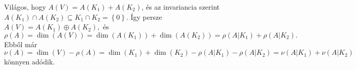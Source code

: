 \documentclass[9pt, a4paper, showtrims]{memoir}
\makeatletter
\renewenvironment{proof}[1][\proofname]
    {\par\pushQED{\qed}%
    \normalfont \topsep6\p@\@plus6\p@\relax
    \trivlist
    \item[\hskip\labelsep
        \itshape
    #1\@addpunct{:}]\ignorespaces}
    {\popQED\endtrivlist\@endpefalse}
\theoremstyle{plain}
\theoremstyle{remark}
\theoremstyle{definition}
\makeatother
\begin{document}
\begin{proof}
	Világos, hogy $A\left( V \right)=A\left( K_1 \right)+A\left( K_2 \right)$, és az
	invariancia szerint $A\left( K_1 \right)\cap A\left( K_2 \right)\subseteq K_1\cap K_2=\left\{ 0 \right\}$.
	Így persze
	\(
	A\left( V \right)=A\left( K_1 \right)\oplus A\left( K_2 \right),
	\)
	és
	\[
		\rho\left( A \right)=
		\dim\left( A\left( V \right) \right)
		=
		\dim \left( A\left( K_1 \right) \right)+
		\dim \left( A\left( K_2 \right) \right)
		=
		\rho\left( A|K_1 \right)+\rho\left( A|K_2 \right).
	\]
	Ebből már
	\[
		\nu\left( A \right)
		=
		\dim\left( V \right)-\rho\left( A \right)
		=\dim\left( K_1 \right)+\dim\left( K_2 \right)-\rho\left( A|K_1 \right)-\rho\left( A|K_2 \right)
		=
		\nu\left( A|K_1 \right)+\nu\left( A|K_2 \right)
	\]
	könnyen adódik.
\end{proof}
\end{document}
